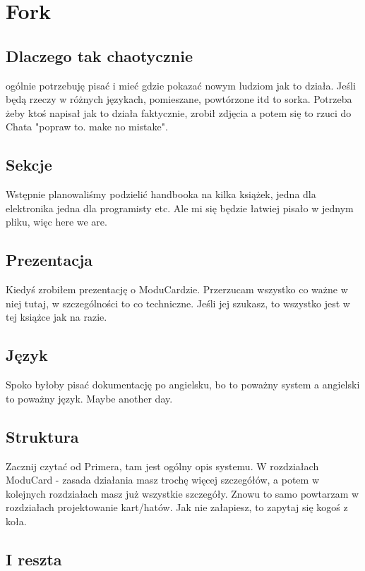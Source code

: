 \documentclass[b5paper, 10pt, twoside]{book}
\begin{document}
\mainmatter

\chapter{Fork}
\section{Dlaczego tak chaotycznie}
ogólnie potrzebuję pisać i mieć gdzie pokazać nowym ludziom jak to działa. Jeśli będą rzeczy w różnych językach, pomieszane, powtórzone itd to sorka.
Potrzeba żeby ktoś napisał jak to działa faktycznie, zrobił zdjęcia a potem się to rzuci do Chata "popraw to. make no mistake".

\section{Sekcje}
Wstępnie planowaliśmy podzielić handbooka na kilka książek, jedna dla elektronika jedna dla programisty etc. Ale mi się będzie łatwiej pisało w jednym pliku, więc here we are.

\section{Prezentacja}
Kiedyś zrobiłem prezentację o ModuCardzie. Przerzucam wszystko co ważne w niej tutaj, w szczególności to co techniczne. Jeśli jej szukasz, to wszystko jest w tej książce jak na razie.


\section{Język}
Spoko byłoby pisać dokumentację po angielsku, bo to poważny system a angielski to poważny język. Maybe another day.

\section{Struktura}
Zacznij czytać od Primera, tam jest ogólny opis systemu. W rozdziałach ModuCard - zasada działania masz trochę więcej szczegółów, a potem w kolejnych rozdziałach masz już wszystkie szczegóły. Znowu to samo powtarzam w rozdziałach projektowanie kart/hatów. Jak nie załapiesz, to zapytaj się kogoś z koła.

\section{I reszta}
\end{document}
